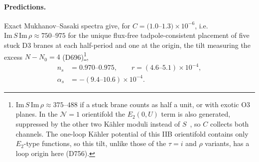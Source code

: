 \documentclass[aps,prd,twocolumn,superscriptaddress,nofootinbib,floatfix]{revtex4-2}
\begin{document}
\paragraph{Predictions.} Exact Mukhanov--Sasaki spectra give, for $C=(1.0$--$1.3)\times10^{-6}$, i.e.\ $\mathrm{Im}\,S\,\mathrm{Im}\,\rho\approx750$--$975$ for the unique flux-free tadpole-consistent placement of five stuck D3 branes at each half-period and one at the origin, the tilt measuring the excess $N-N_0=4$ (D696)\footnote{$\mathrm{Im}\,S\,\mathrm{Im}\,\rho\approx375$--$488$ if a stuck brane counts as half a unit, or with exotic O3 planes. In the $\mathcal N=1$ orientifold the $E_2(0,U)$ term is also generated, suppressed by the other two K\"ahler moduli instead of $S$~\cite{BHK2005}, so $C$ collects both channels. The one-loop K\"ahler potential of this IIB orientifold contains only $E_2$-type functions, so this tilt, unlike those of the $\tau=i$ and $\rho$ variants, has a loop origin here (D756).},
\begin{align}
n_s&=0.970\text{--}0.975,\qquad r=(4.6\text{--}5.1)\times10^{-4},\nonumber\\
\alpha_s&=-(9.4\text{--}10.6)\times10^{-4}.
\end{align}
\end{document}
